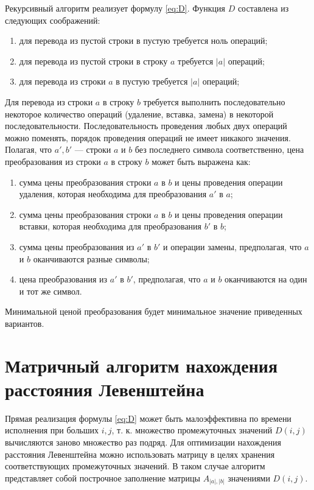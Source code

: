        Рекурсивный алгоритм реализует формулу \ref{eq:D}.
        Функция $D$ составлена из следующих соображений:
        \begin{enumerate}
        	\item для перевода из пустой строки в пустую требуется ноль операций;
        	\item для перевода из пустой строки в строку $a$ требуется $|a|$ операций;
        	\item для перевода из строки $a$ в пустую требуется $|a|$ операций;
        \end{enumerate}
        Для перевода из строки $a$ в строку $b$ требуется выполнить последовательно некоторое количество операций (удаление, вставка, замена) в некоторой последовательности. Последовательность проведения любых двух операций можно поменять, порядок проведения операций не имеет никакого значения. Полагая, что $a', b'$  — строки $a$ и $b$ без последнего символа соответственно, цена преобразования из строки $a$ в строку $b$ может быть выражена как:
        	\begin{enumerate}
        		\item сумма цены преобразования строки $a$ в $b$ и цены проведения операции удаления, которая необходима для преобразования $a'$ в $a$;
        		\item сумма цены преобразования строки $a$ в $b$  и цены проведения операции вставки, которая необходима для преобразования $b'$ в $b$;
        		\item сумма цены преобразования из $a'$ в $b'$ и операции замены, предполагая, что $a$ и $b$ оканчиваются разные символы;
        		\item цена преобразования из $a'$ в $b'$, предполагая, что $a$ и $b$ оканчиваются на один и тот же символ.
        	\end{enumerate}
        Минимальной ценой преобразования будет минимальное значение приведенных вариантов.
    
    \section{Матричный алгоритм нахождения расстояния Левенштейна}
    
        Прямая реализация формулы \ref{eq:D} может быть малоэффективна по времени исполнения при больших $i, j$, т. к. множество промежуточных значений $D(i, j)$ вычисляются заново множество раз подряд. Для оптимизации нахождения расстояния Левенштейна можно использовать матрицу в целях хранения соответствующих промежуточных значений. В таком случае алгоритм представляет собой построчное заполнение матрицы 
        $A_{|a|,|b|}$ значениями $D(i, j)$.
    
